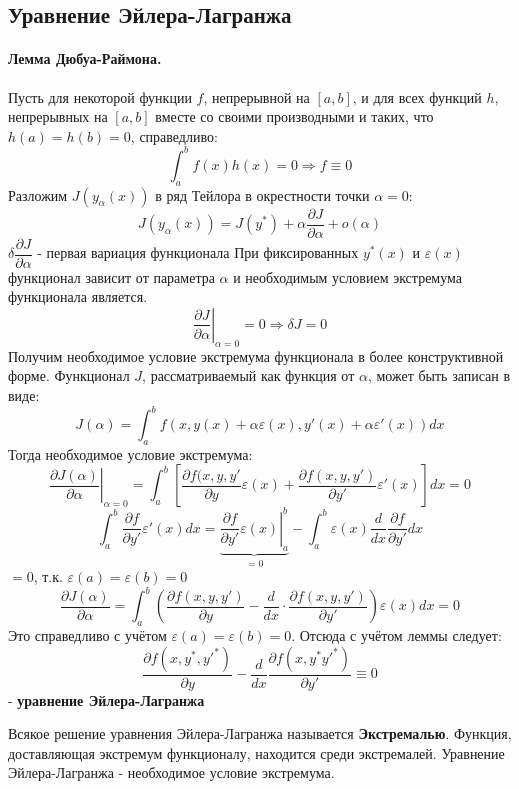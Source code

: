 \documentclass[a4paper, 14pt]{extarticle}
\numberwithin{equation}{section}
\begin{document}
    \subsection{Уравнение Эйлера-Лагранжа}
    \paragraph{Лемма Дюбуа-Раймона.} Пусть для некоторой функции $f$, непрерывной на $[a,b]$, и для всех функций $h$, непрерывных на $[a,b]$ вместе со своими производными и таких, что $h(a)=h(b)=0$, справедливо: 
    \[ \int_a^b f(x)h(x) = 0 \Rightarrow f \equiv 0 \]
    Разложим $J(y_\alpha(x))$ в ряд Тейлора в окрестности точки $\alpha = 0$:
    \[ J(y_\alpha(x)) = J(y^*) + \alpha \frac{\partial J}{\partial \alpha} + o(\alpha) \]
    $\delta \dfrac{\partial J}{\partial \alpha}$ - первая вариация функционала 
    При фиксированных $y^*(x)$ и $\varepsilon(x)$ функционал зависит от параметра $\alpha$ и необходимым условием экстремума функционала является.
    \[ \left. \frac{\partial J}{\partial \alpha} \right|_{\alpha = 0} = 0 \Rightarrow \delta J = 0 \]
    Получим необходимое условие экстремума функционала в более конструктивной форме. Функционал $J$, рассматриваемый как функция от $\alpha$, может быть записан в виде:
    \[ J(\alpha) = \int_a^b f(x, y(x) + \alpha \varepsilon(x), y'(x) + \alpha \varepsilon'(x)) dx \]
    Тогда необходимое условие экстремума:
    \[ \left. \frac{\partial J (\alpha)}{\partial \alpha} \right|_{\alpha = 0}
        = \int^b_a \left[ \frac{\partial f(x, y, y'}{\partial y} \varepsilon(x) + \frac{\partial f(x,y,y')}{\partial y'} \varepsilon'(x) \right] dx = 0 \]
    \[ \int^b_a \frac{\partial f}{\partial y'} \varepsilon'(x) dx = 
        \underbrace{\left. \frac{\partial f}{\partial y'} \varepsilon(x) \right|_a^b}_{=0} - 
    \int^b_a \varepsilon(x) \frac{d}{dx} \frac{\partial f}{\partial y'} dx \]
    $=0$, т.к. $\varepsilon(a)=\varepsilon(b)=0$
    \[ \frac{\partial J(\alpha)}{\partial \alpha} = 
    \int_a^b \left( \frac{ \partial f(x,y,y') }{\partial y} - \frac{d}{dx} \cdot \frac{\partial f(x, y, y')}{\partial y'} \right) \varepsilon(x)dx=0\]
    Это справедливо с учётом $\varepsilon(a)=\varepsilon(b)=0$. Отсюда с учётом леммы следует:
    \[ \frac{\partial f(x,y^*,y'^*)}{\partial y} - \frac{d}{dx} \frac{\partial f(x, y^* y'^*)}{\partial y'} \equiv 0 \]
    - \textbf{уравнение Эйлера-Лагранжа}
    
    Всякое решение уравнения Эйлера-Лагранжа называется \textbf{Экстремалью}. Функция, доставляющая экстремум функционалу, находится среди экстремалей. Уравнение Эйлера-Лагранжа - необходимое условие экстремума. 
\end{document}
